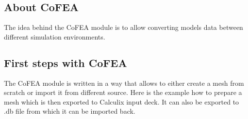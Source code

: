 \documentclass[letterpaper,10pt,english]{sphinxmanual}
\begin{document}
\subsection{About CoFEA}
\label{\detokenize{pyCofea/about:about-cofea}}\label{\detokenize{pyCofea/about::doc}}
The idea behind the CoFEA module is to allow converting models data between different simulation environments.


\subsection{First steps with CoFEA}
\label{\detokenize{pyCofea/about:first-steps-with-cofea}}
The CoFEA module is written in a way that allows to either create a mesh from scratch or import it from different source. Here is the example how to prepare a mesh which is then exported to Calculix input deck. It can also be exported to .db file from which it can be imported back.
\end{document}
